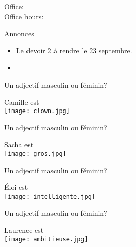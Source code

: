 \documentclass{beamer}
\subtitle[Femmes et questions]{Les femmes et les questions}
\begin{document}
  \begin{frame}
    \titlepage
    \tiny{Office: \\
          Office hours: }
  \end{frame}

  \begin{frame}{Annonces}
    \begin{itemize}
      \item Le devoir 2 à rendre le 23 septembre.
      \item[] 
    \end{itemize}
  \end{frame}

  \begin{frame}{Un adjectif masculin ou féminin?}
    \begin{center}
      Camille est \underline{} \\
      \texttt{[image: clown.jpg]}
    \end{center}
  \end{frame}

  \begin{frame}{Un adjectif masculin ou féminin?}
    \begin{center}
      Sacha est \underline{} \\
      \texttt{[image: gros.jpg]}
    \end{center}
  \end{frame}

  \begin{frame}{Un adjectif masculin ou féminin?}
    \begin{center}
      Éloi est \underline{} \\
      \texttt{[image: intelligente.jpg]}
    \end{center}
  \end{frame}

  \begin{frame}{Un adjectif masculin ou féminin?}
    \begin{center}
      Laurence est \underline{} \\
      \texttt{[image: ambitieuse.jpg]}
    \end{center}
  \end{frame}
\end{document}
